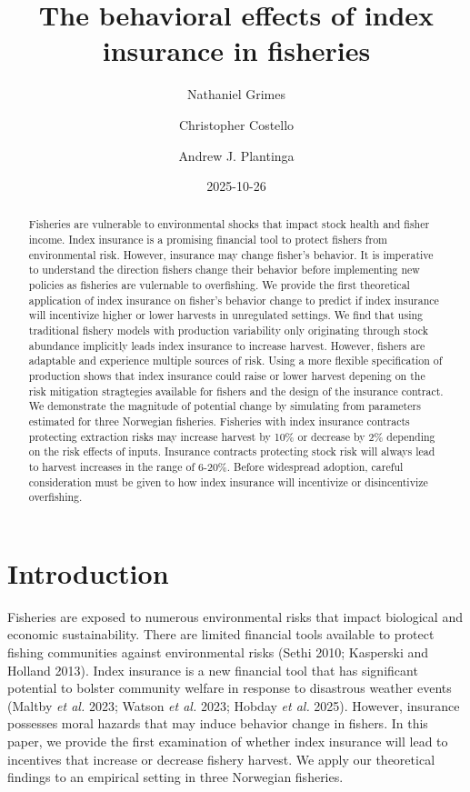 \documentclass[
  letterpaper,
  DIV=11,
  numbers=noendperiod]{scrartcl}
\title{The behavioral effects of index insurance in fisheries}
\author{Nathaniel Grimes \and Christopher Costello \and Andrew J.
Plantinga}
\date{2025-10-26}
\renewcommand*\contentsname{Table of contents}
\newcommand\contentsname{Table of contents}
\theoremstyle{plain}
\theoremstyle{plain}
\theoremstyle{remark}
\begin{document}
\maketitle
\begin{abstract}
Fisheries are vulnerable to environmental shocks that impact stock
health and fisher income. Index insurance is a promising financial tool
to protect fishers from environmental risk. However, insurance may
change fisher's behavior. It is imperative to understand the direction
fishers change their behavior before implementing new policies as
fisheries are vulernable to overfishing. We provide the first
theoretical application of index insurance on fisher's behavior change
to predict if index insurance will incentivize higher or lower harvests
in unregulated settings. We find that using traditional fishery models
with production variability only originating through stock abundance
implicitly leads index insurance to increase harvest. However, fishers
are adaptable and experience multiple sources of risk. Using a more
flexible specification of production shows that index insurance could
raise or lower harvest depening on the risk mitigation stragtegies
available for fishers and the design of the insurance contract. We
demonstrate the magnitude of potential change by simulating from
parameters estimated for three Norwegian fisheries. Fisheries with index
insurance contracts protecting extraction risks may increase harvest by
10\% or decrease by 2\% depending on the risk effects of inputs.
Insurance contracts protecting stock risk will always lead to harvest
increases in the range of 6-20\%. Before widespread adoption, careful
consideration must be given to how index insurance will incentivize or
disincentivize overfishing.
\end{abstract}

\renewcommand*\contentsname{Table of contents}
{
\hypersetup{linkcolor=}
\setcounter{tocdepth}{3}
\tableofcontents
}

\section{Introduction}\label{introduction}

Fisheries are exposed to numerous environmental risks that impact
biological and economic sustainability. There are limited financial
tools available to protect fishing communities against environmental
risks (Sethi 2010; Kasperski and Holland 2013). Index insurance is a new
financial tool that has significant potential to bolster community
welfare in response to disastrous weather events (Maltby \emph{et al.}
2023; Watson \emph{et al.} 2023; Hobday \emph{et al.} 2025). However,
insurance possesses moral hazards that may induce behavior change in
fishers. In this paper, we provide the first examination of whether
index insurance will lead to incentives that increase or decrease
fishery harvest. We apply our theoretical findings to an empirical
setting in three Norwegian fisheries.
\end{document}
